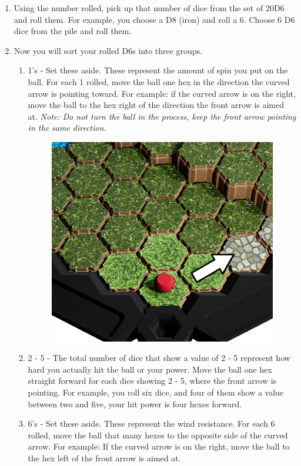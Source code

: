 \documentclass[../main.tex]{subfiles}
\begin{document}
\begin{enumerate}
\item Using the number rolled, pick up that number of dice from the set of 20D6 and roll them. For example, you choose a D8 (iron) and roll a 6. Choose 6 D6 dice from the pile and roll them. 
\item Now you will sort your rolled D6s into three groups. 
\begin{enumerate}
\item 1's - Set these aside. These represent the amount of spin you put on the ball. For each 1 rolled, move the ball one hex in the direction the curved arrow is pointing toward. For example: if the curved arrow is on the right, move the ball to the hex right of the direction the front arrow is aimed at. \textit{Note: Do not turn the ball in the process, keep the front arrow pointing in the same direction.}

\begin{figure}[h]
    \centering
    \includegraphics[width=0.75\linewidth]{chapters//startingsourcegolf/Source Golf CurvedArrowDirectional.png}   
\end{figure}

\item 2 - 5 - The total number of dice that show a value of 2 - 5 represent how hard you actually hit the ball or your power. Move the ball one hex straight forward for each dice showing 2 - 5, where the front arrow is pointing.  For example, you roll six dice, and four of them show a value between two and five,  your hit power is four hexes forward. 

\item 6's - Set these aside. These represent the wind resistance. For each 6 rolled, move the ball that many hexes to the opposite side of the curved arrow. For example: If the curved arrow is on the right, move the ball to the hex left of the front arrow is aimed at. 


\end{enumerate}
\end{enumerate}
\end{document}
